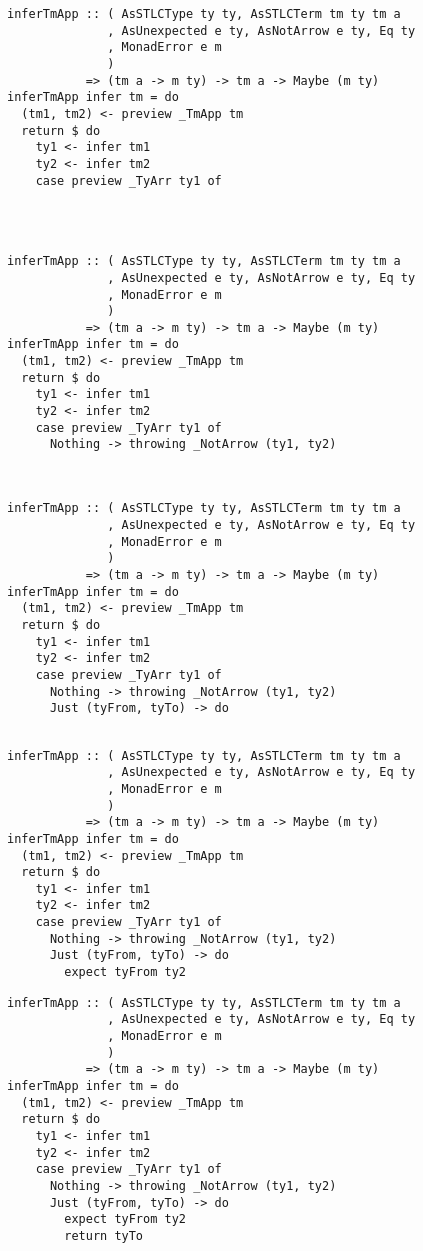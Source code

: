 \documentclass[aspectration=169]{beamer}
\begin{document}
\begin{frame}[fragile]
\begin{overprint}
\begin{verbatim}
  \end{verbatim}  
  \begin{verbatim}
inferTmApp :: ( AsSTLCType ty ty, AsSTLCTerm tm ty tm a
              , AsUnexpected e ty, AsNotArrow e ty, Eq ty
              , MonadError e m
              )
           => (tm a -> m ty) -> tm a -> Maybe (m ty)
inferTmApp infer tm = do
  (tm1, tm2) <- preview _TmApp tm
  return $ do
    ty1 <- infer tm1
    ty2 <- infer tm2
    case preview _TyArr ty1 of




  \end{verbatim}  
  \begin{verbatim}
inferTmApp :: ( AsSTLCType ty ty, AsSTLCTerm tm ty tm a
              , AsUnexpected e ty, AsNotArrow e ty, Eq ty
              , MonadError e m
              )
           => (tm a -> m ty) -> tm a -> Maybe (m ty)
inferTmApp infer tm = do
  (tm1, tm2) <- preview _TmApp tm
  return $ do
    ty1 <- infer tm1
    ty2 <- infer tm2
    case preview _TyArr ty1 of
      Nothing -> throwing _NotArrow (ty1, ty2)



  \end{verbatim}  
  \begin{verbatim}
inferTmApp :: ( AsSTLCType ty ty, AsSTLCTerm tm ty tm a
              , AsUnexpected e ty, AsNotArrow e ty, Eq ty
              , MonadError e m
              )
           => (tm a -> m ty) -> tm a -> Maybe (m ty)
inferTmApp infer tm = do
  (tm1, tm2) <- preview _TmApp tm
  return $ do
    ty1 <- infer tm1
    ty2 <- infer tm2
    case preview _TyArr ty1 of
      Nothing -> throwing _NotArrow (ty1, ty2)
      Just (tyFrom, tyTo) -> do


  \end{verbatim}  
  \begin{verbatim}
inferTmApp :: ( AsSTLCType ty ty, AsSTLCTerm tm ty tm a
              , AsUnexpected e ty, AsNotArrow e ty, Eq ty
              , MonadError e m
              )
           => (tm a -> m ty) -> tm a -> Maybe (m ty)
inferTmApp infer tm = do
  (tm1, tm2) <- preview _TmApp tm
  return $ do
    ty1 <- infer tm1
    ty2 <- infer tm2
    case preview _TyArr ty1 of
      Nothing -> throwing _NotArrow (ty1, ty2)
      Just (tyFrom, tyTo) -> do
        expect tyFrom ty2

  \end{verbatim}  
  \begin{verbatim}
inferTmApp :: ( AsSTLCType ty ty, AsSTLCTerm tm ty tm a
              , AsUnexpected e ty, AsNotArrow e ty, Eq ty
              , MonadError e m
              )
           => (tm a -> m ty) -> tm a -> Maybe (m ty)
inferTmApp infer tm = do
  (tm1, tm2) <- preview _TmApp tm
  return $ do
    ty1 <- infer tm1
    ty2 <- infer tm2
    case preview _TyArr ty1 of
      Nothing -> throwing _NotArrow (ty1, ty2)
      Just (tyFrom, tyTo) -> do
        expect tyFrom ty2
        return tyTo
  \end{verbatim}  
  \end{overprint}
\end{frame}
\end{document}
